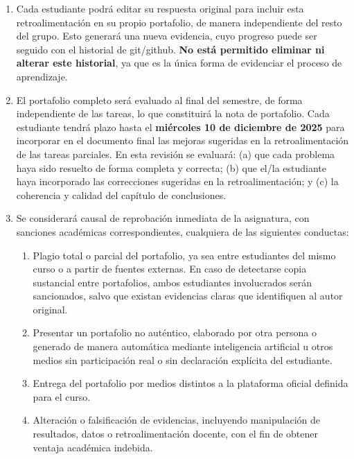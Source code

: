 \documentclass[../portafolio.tex]{subfiles}
\begin{document}
\begin{enumerate}
\item Cada estudiante podrá editar su respuesta original para incluir
  esta retroalimentación en su propio portafolio, de manera
  independiente del resto del grupo.  Esto generará una nueva
  evidencia, cuyo progreso puede ser seguido con el historial de
  git/github. \textbf{No está permitido eliminar ni alterar este
    historial}, ya que es la única forma de evidenciar el proceso de
  aprendizaje.

\item El portafolio completo será evaluado al final del semestre, de
  forma independiente de las tareas, lo que constituirá la nota de
  portafolio. Cada estudiante tendrá plazo hasta el \textbf{miércoles
    10 de diciembre de 2025} para incorporar en el documento final las
  mejoras sugeridas en la retroalimentación de las tareas
  parciales. En esta revisión se evaluará: (a) que cada problema haya
  sido resuelto de forma completa y correcta; (b) que el/la estudiante
  haya incorporado las correcciones sugeridas en la retroalimentación; y (c) la
  coherencia y calidad del capítulo de conclusiones.

\item Se considerará causal de reprobación inmediata de la asignatura,
  con sanciones académicas correspondientes, cualquiera de las
  siguientes conductas:
  \begin{enumerate}
  \item Plagio total o parcial del portafolio, ya sea entre
    estudiantes del mismo curso o a partir de fuentes externas. En
    caso de detectarse copia sustancial entre portafolios, ambos
    estudiantes involucrados serán sancionados, salvo que existan
    evidencias claras que identifiquen al autor original.

  \item Presentar un portafolio no auténtico, elaborado por otra
    persona o generado de manera automática mediante inteligencia
    artificial u otros medios sin participación real o sin declaración
    explícita del estudiante.

  \item Entrega del portafolio por medios distintos a la plataforma
    oficial definida para el curso.

  \item Alteración o falsificación de evidencias, incluyendo
    manipulación de resultados, datos o retroalimentación docente, con
    el fin de obtener ventaja académica indebida.
  \end{enumerate}
\end{enumerate}
\end{document}
